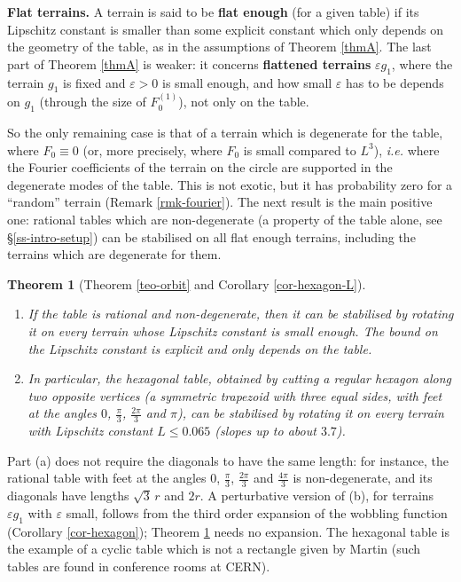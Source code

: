 \documentclass[a4paper,11pt,twoside,leqno]{article}
\newtheorem{teoalph}{Theorem}
\newcommand{\ie}[0]{\emph{i.e.} }
\newcommand{\eps}[0]{\varepsilon}
\numberwithin{equation}{section}
\begin{document}
\textbf{Flat terrains.} A terrain is said to be \textbf{flat enough} (for a given table) if its Lipschitz constant is smaller than some explicit constant which only depends on the geometry of the table, as in the assumptions of Theorem \ref{thmA}. The last part of Theorem \ref{thmA} is weaker: it concerns \textbf{flattened terrains} $\eps g_1$, where the terrain $g_1$ is fixed and $\eps > 0$ is small enough, and how small $\eps$ has to be depends on $g_1$ (through the size of $F_0^{(1)}$), not only on the table.

So the only remaining case is that of a terrain which is degenerate for the table, where $F_0 \equiv 0$ (or, more precisely, where $F_0$ is small compared to $L^3$), \ie where the Fourier coefficients of the terrain on the circle are supported in the degenerate modes of the table. This is not exotic, but it has probability zero for a ``random'' terrain (Remark \ref{rmk-fourier}). The next result is the main positive one: rational tables which are non-degenerate (a property of the table alone, see \S{}\ref{ss-intro-setup}) can be stabilised on all flat enough terrains, including the terrains which are degenerate for them.

\begin{teoalph}[Theorem \ref{teo-orbit} and Corollary \ref{cor-hexagon-L}]\label{thmB}
\begin{enumerate}\renewcommand{\theenumi}{\bfseries (\alph{enumi})}
 \item If the table is rational and non-degenerate, then it can be stabilised by rotating it on every terrain whose Lipschitz constant is small enough. The bound on the Lipschitz constant is explicit and only depends on the table.
 \item In particular, the \emph{hexagonal table}, obtained by cutting a regular hexagon along two opposite vertices (a symmetric trapezoid with three equal sides, with feet at the angles $0$, $\frac{\pi}{3}$, $\frac{2\pi}{3}$ and $\pi$), can be stabilised by rotating it on every terrain with Lipschitz constant $L \leq 0.065$ (slopes up to about $3.7$\textdegree{}).
\end{enumerate}
\end{teoalph}

Part (a) does not require the diagonals to have the same length: for instance, the rational table with feet at the angles $0$, $\frac{\pi}{3}$, $\frac{2\pi}{3}$ and $\frac{4\pi}{3}$ is non-degenerate, and its diagonals have lengths $\sqrt{3}\, r$ and $2r$. A perturbative version of (b), for terrains $\eps g_1$ with $\eps$ small, follows from the third order expansion of the wobbling function (Corollary \ref{cor-hexagon}); Theorem \ref{thmB} needs no expansion. The hexagonal table is the example of a cyclic table which is not a rectangle given by Martin \cite[\S{}4]{Mar} (such tables are found in conference rooms at CERN).
\end{document}

